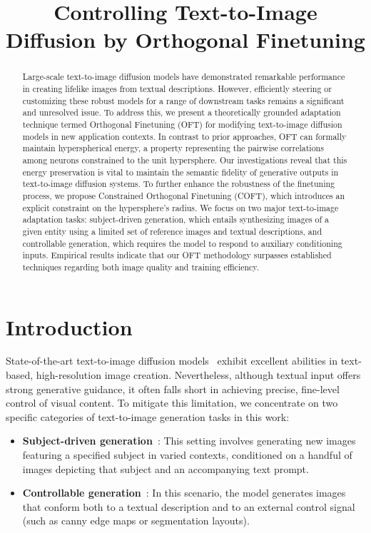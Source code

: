 \title{Controlling Text-to-Image Diffusion by Orthogonal Finetuning}

\begin{abstract}
Large-scale text-to-image diffusion models have demonstrated remarkable performance in creating lifelike images from textual descriptions. However, efficiently steering or customizing these robust models for a range of downstream tasks remains a significant and unresolved issue. To address this, we present a theoretically grounded adaptation technique termed Orthogonal Finetuning (OFT) for modifying text-to-image diffusion models in new application contexts. In contrast to prior approaches, OFT can formally maintain hyperspherical energy, a property representing the pairwise correlations among neurons constrained to the unit hypersphere. Our investigations reveal that this energy preservation is vital to maintain the semantic fidelity of generative outputs in text-to-image diffusion systems. To further enhance the robustness of the finetuning process, we propose Constrained Orthogonal Finetuning (COFT), which introduces an explicit constraint on the hypersphere’s radius. We focus on two major text-to-image adaptation tasks: subject-driven generation, which entails synthesizing images of a given entity using a limited set of reference images and textual descriptions, and controllable generation, which requires the model to respond to auxiliary conditioning inputs. Empirical results indicate that our OFT methodology surpasses established techniques regarding both image quality and training efficiency.
\end{abstract}

\section{Introduction}

State-of-the-art text-to-image diffusion models~\cite{saharia2022photorealistic,ramesh2022hierarchical,rombach2022high} exhibit excellent abilities in text-based, high-resolution image creation. Nevertheless, although textual input offers strong generative guidance, it often falls short in achieving precise, fine-level control of visual content. To mitigate this limitation, we concentrate on two specific categories of text-to-image generation tasks in this work:

\begin{itemize}[leftmargin=*,nosep]

    \item \textbf{Subject-driven generation}~\cite{ruiz2023dreambooth}: This setting involves generating new images featuring a specified subject in varied contexts, conditioned on a handful of images depicting that subject and an accompanying text prompt.
    \item \textbf{Controllable generation}~\cite{zhang2023adding,mou2023t2i}: In this scenario, the model generates images that conform both to a textual description and to an external control signal (such as canny edge maps or segmentation layouts).
\end{itemize}

